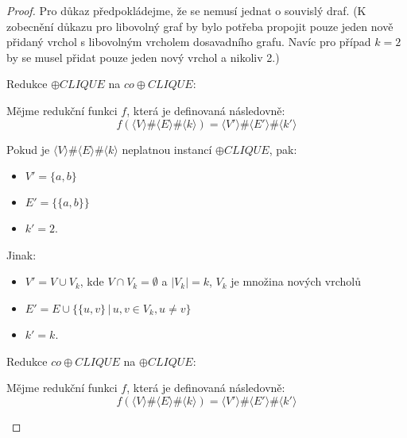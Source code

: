 \documentclass[a4paper, 11pt, fleqn]{scrartcl}
\begin{document}
    \begin{proof}
      Pro důkaz předpokládejme, že se nemusí jednat o souvislý draf. (K zobecnění důkazu pro libovolný graf by bylo potřeba propojit pouze jeden nově přidaný vrchol s libovolným vrcholem dosavadního grafu. Navíc pro případ $k = 2$ by se musel přidat pouze jeden nový vrchol a nikoliv 2.)

      \vspace{0.5cm}

      Redukce $\oplus\mathit{CLIQUE}$ na $\mathit{co}\oplus\mathit{CLIQUE}$:

        \begin{adjustwidth}{1em}{0em}
          Mějme redukční funkci $f$, která je definovaná následovně:
          $$ f(\langle V \rangle \# \langle E \rangle \# \langle k \rangle) = \langle V' \rangle \# \langle E' \rangle \# \langle k' \rangle$$

          Pokud je $\langle V \rangle \# \langle E \rangle \# \langle k \rangle$ neplatnou instancí $\oplus\mathit{CLIQUE}$, pak:
          \begin{itemize}
            \item $V' = \{a, b\}$
            \item $E' = \{\{a, b\}\}$
            \item $k' = 2$.
          \end{itemize}

          Jinak:
          \begin{itemize}
            \item $V' = V \cup V_k$, kde $V \cap V_k = \emptyset$ a $|V_k| = k$, $V_k$ je množina nových vrcholů
            \item $E' = E \cup \{\{u, v\}\,|\, u, v \in V_k, u \neq v\}$
            \item $k' = k$.
          \end{itemize}
        \end{adjustwidth}

        \vspace{0.5cm}

        Redukce $\mathit{co}\oplus\mathit{CLIQUE}$ na $\oplus\mathit{CLIQUE}$:

        \begin{adjustwidth}{1em}{0em}
          Mějme redukční funkci $f$, která je definovaná následovně:
          $$ f(\langle V \rangle \# \langle E \rangle \# \langle k \rangle) = \langle V' \rangle \# \langle E' \rangle \# \langle k' \rangle$$


\end{adjustwidth}
\end{proof}
\end{document}
